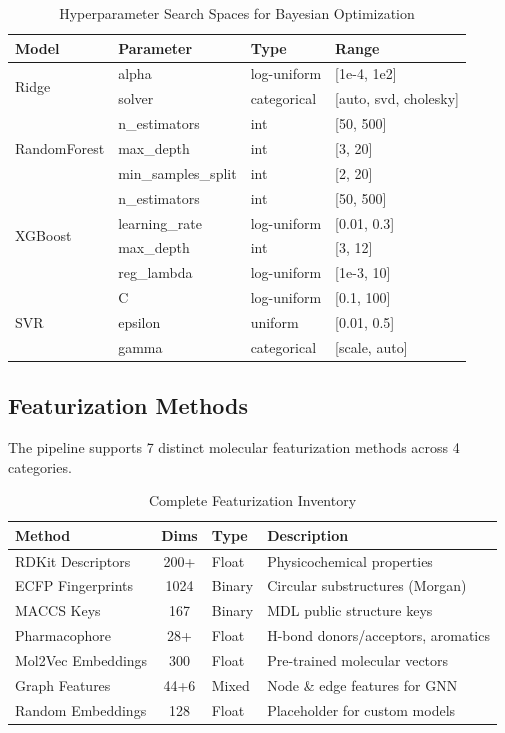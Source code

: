 \documentclass[11pt,a4paper]{article}
\begin{document}
\begin{table}[H]
\centering
\caption{Hyperparameter Search Spaces for Bayesian Optimization}
\begin{tabular}{@{}llll@{}}
\toprule
\textbf{Model} & \textbf{Parameter} & \textbf{Type} & \textbf{Range} \\
\midrule
\multirow{2}{*}{Ridge} & alpha & log-uniform & [1e-4, 1e2] \\
 & solver & categorical & [auto, svd, cholesky] \\
\midrule
\multirow{3}{*}{RandomForest} & n\_estimators & int & [50, 500] \\
 & max\_depth & int & [3, 20] \\
 & min\_samples\_split & int & [2, 20] \\
\midrule
\multirow{4}{*}{XGBoost} & n\_estimators & int & [50, 500] \\
 & learning\_rate & log-uniform & [0.01, 0.3] \\
 & max\_depth & int & [3, 12] \\
 & reg\_lambda & log-uniform & [1e-3, 10] \\
\midrule
\multirow{3}{*}{SVR} & C & log-uniform & [0.1, 100] \\
 & epsilon & uniform & [0.01, 0.5] \\
 & gamma & categorical & [scale, auto] \\
\bottomrule
\end{tabular}
\end{table}

\subsection{Featurization Methods}

The pipeline supports 7 distinct molecular featurization methods across 4 categories.

\begin{table}[H]
\centering
\caption{Complete Featurization Inventory}
\begin{tabular}{@{}lclp{5.5cm}@{}}
\toprule
\textbf{Method} & \textbf{Dims} & \textbf{Type} & \textbf{Description} \\
\midrule
RDKit Descriptors & 200+ & Float & Physicochemical properties \\
ECFP Fingerprints & 1024 & Binary & Circular substructures (Morgan) \\
MACCS Keys & 167 & Binary & MDL public structure keys \\
Pharmacophore & 28+ & Float & H-bond donors/acceptors, aromatics \\
Mol2Vec Embeddings & 300 & Float & Pre-trained molecular vectors \\
Graph Features & 44+6 & Mixed & Node \& edge features for GNN \\
Random Embeddings & 128 & Float & Placeholder for custom models \\
\bottomrule
\end{tabular}
\end{table}
\end{document}
